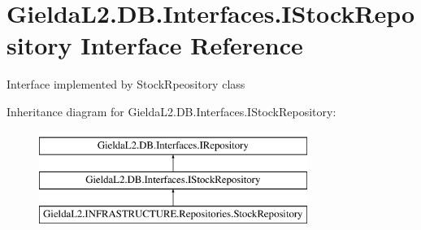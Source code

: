 \hypertarget{interface_gielda_l2_1_1_d_b_1_1_interfaces_1_1_i_stock_repository}{}\section{Gielda\+L2.\+D\+B.\+Interfaces.\+I\+Stock\+Repository Interface Reference}
\label{interface_gielda_l2_1_1_d_b_1_1_interfaces_1_1_i_stock_repository}


Interface implemented by Stock\+Rpeository class  


Inheritance diagram for Gielda\+L2.\+D\+B.\+Interfaces.\+I\+Stock\+Repository\+:\begin{figure}[H]
\begin{center}
\leavevmode
\includegraphics[height=3.000000cm]{interface_gielda_l2_1_1_d_b_1_1_interfaces_1_1_i_stock_repository}
\end{center}
\end{figure}

